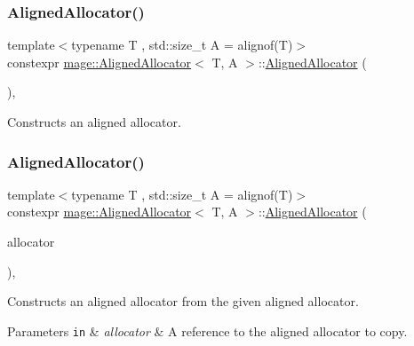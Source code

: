 \subsubsection{\texorpdfstring{Aligned\+Allocator()}{AlignedAllocator()}\hspace{0.1cm}{\footnotesize\ttfamily [1/4]}}
{\footnotesize\ttfamily template$<$typename T , std\+::size\+\_\+t A = alignof(\+T)$>$ \\
constexpr \mbox{\hyperlink{classmage_1_1_aligned_allocator}{mage\+::\+Aligned\+Allocator}}$<$ T, A $>$\+::\mbox{\hyperlink{classmage_1_1_aligned_allocator}{Aligned\+Allocator}} (\begin{DoxyParamCaption}{ }\end{DoxyParamCaption})\hspace{0.3cm}{\ttfamily [default]}, {\ttfamily [noexcept]}}

Constructs an aligned allocator. \mbox{\label{classmage_1_1_aligned_allocator_a724b0692cf3c5e217c1281eaabd1ca4b}} 
\subsubsection{\texorpdfstring{Aligned\+Allocator()}{AlignedAllocator()}\hspace{0.1cm}{\footnotesize\ttfamily [2/4]}}
{\footnotesize\ttfamily template$<$typename T , std\+::size\+\_\+t A = alignof(\+T)$>$ \\
constexpr \mbox{\hyperlink{classmage_1_1_aligned_allocator}{mage\+::\+Aligned\+Allocator}}$<$ T, A $>$\+::\mbox{\hyperlink{classmage_1_1_aligned_allocator}{Aligned\+Allocator}} (\begin{DoxyParamCaption}\item[{const \mbox{\hyperlink{classmage_1_1_aligned_allocator}{Aligned\+Allocator}}$<$ T, A $>$ \&}]{allocator }\end{DoxyParamCaption})\hspace{0.3cm}{\ttfamily [default]}, {\ttfamily [noexcept]}}

Constructs an aligned allocator from the given aligned allocator.


\begin{DoxyParams}[1]{Parameters}
\mbox{\tt in}  & {\em allocator} & A reference to the aligned allocator to copy. \\
\hline
\end{DoxyParams}
\mbox{\label{classmage_1_1_aligned_allocator_ac2ef3124c1e18e07bb75006c28967c11}} 
